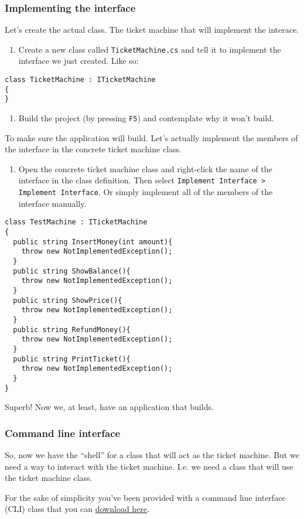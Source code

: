 \documentclass{article}
\newcounter{stepcounter}
\newenvironment{steps}{ 
  \begin{enumerate}[label=\color{red}Step \thesection-\theenumi)]
    \setcounter{enumi}{\value{stepcounter}}
}{
  \setcounter{stepcounter}{\value{enumi}}
  \end{enumerate}
}
\begin{document}
\subsubsection{Implementing the interface}
Let’s create the actual class. The ticket machine that will implement the interace.
\begin{steps}
\item Create a new class called \texttt{TicketMachine.cs} and tell it to implement the interface we just created. Like so:
\end{steps}
\begin{lstlisting}
class TicketMachine : ITicketMachine
{
}
\end{lstlisting}
\begin{steps}
\item Build the project (by pressing \texttt{F5}) and contemplate why it won't build.
\end{steps}
To make sure the application will build. Let's actually implement the members of the interface in the concrete ticket machine class.
\begin{steps}
\item Open the concrete ticket machine class and right-click the name of the interface in the class definition. Then select \texttt{Implement Interface > Implement Interface}. Or simply implement all of the members of the interface manually.
\end{steps}
\begin{lstlisting}
class TestMachine : ITicketMachine
{
  public string InsertMoney(int amount){
    throw new NotImplementedException();
  }
  public string ShowBalance(){
    throw new NotImplementedException();
  }
  public string ShowPrice(){
    throw new NotImplementedException();
  }
  public string RefundMoney(){
    throw new NotImplementedException();
  }
  public string PrintTicket(){
    throw new NotImplementedException();
  }
}
\end{lstlisting}
Superb! Now we, at least, have an application that builds.


\subsubsection{Command line interface}
So, now we have the ``shell'' for a class that will act as the ticket machine. But we need a way to interact with the ticket machine. I.e. we need a class that will use the ticket machine class.

For the sake of simplicity you've been provided with a command line interface (CLI) class that you can \href{https://raw.githubusercontent.com/chrokh/software-engineering-labs/master/b1-oop/code/TicketMachine/TicketMachine/TicketMachineInteractor.cs}{download here}.
\end{document}
